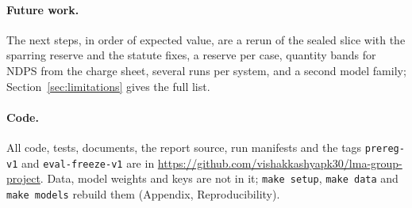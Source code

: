 \paragraph{Future work.} The next steps, in order of expected value, are a rerun of the sealed slice with the sparring reserve and the statute fixes, a reserve per case, quantity bands for NDPS from the charge sheet, several runs per system, and a second model family; Section~\ref{sec:limitations} gives the full list.

\paragraph{Code.} All code, tests, documents, the report source, run manifests and the tags \texttt{prereg-v1} and \texttt{eval-freeze-v1} are in \url{https://github.com/vishakkashyapk30/lma-group-project}. Data, model weights and keys are not in it; \texttt{make setup}, \texttt{make data} and \texttt{make models} rebuild them (Appendix, Reproducibility).

